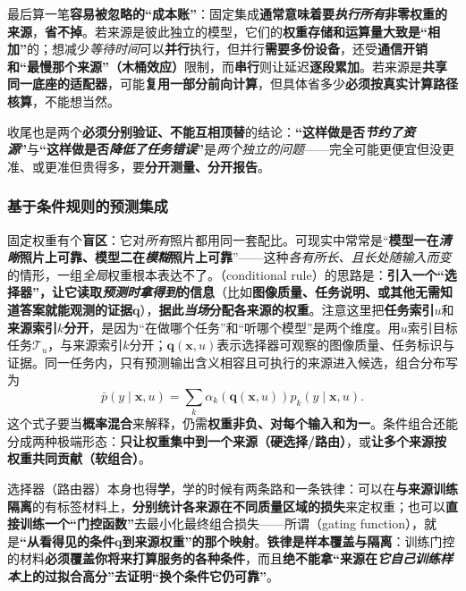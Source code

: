 最后算一笔\textbf{容易被忽略的“成本账”}：固定集成\textbf{通常意味着要\emph{执行所有}非零权重的来源}，\textbf{省不掉}。若来源是彼此独立的模型，它们的\textbf{权重存储和运算量大致是“相加”}的；想减少\emph{等待时间}可以\textbf{并行}执行，但并行\textbf{需要多份设备}，还受\textbf{通信开销和“最慢那个来源”（木桶效应）}限制，而\textbf{串行}则让延迟\textbf{逐段累加}。若来源是\textbf{共享同一底座的适配器}，可能\textbf{复用一部分前向计算}，但具体省多少\textbf{必须按真实计算路径核算}，不能想当然。

收尾也是两个\textbf{必须分别验证、不能互相顶替}的结论：\textbf{“这样做是否\emph{节约了资源}”}与\textbf{“这样做是否\emph{降低了任务错误}”}是\emph{两个独立的问题}——完全可能更便宜但没更准、或更准但贵得多，要\textbf{分开测量、分开报告}。

\subsubsection{基于条件规则的预测集成}
\label{sec:ket-integration-conditional-prediction}

固定权重有个\textbf{盲区}：它对\emph{所有}照片都用同一套配比。可现实中常常是“\textbf{模型一在\emph{清晰}照片上可靠、模型二在\emph{模糊}照片上可靠}”——这种\emph{各有所长、且长处随输入而变}的情形，一组\emph{全局}权重根本表达不了。（conditional rule）的思路是：\textbf{引入一个“选择器”，让它读取\emph{预测时拿得到}的信息}（比如\textbf{图像质量、任务说明、或其他无需知道答案就能观测的证据}$\bm{q}$），\textbf{据此\emph{当场}分配各来源的权重}。注意这里把\textbf{任务索引}$u$和\textbf{来源索引}$k$\textbf{分开}，是因为“在做哪个任务”和“听哪个模型”是两个维度。用$u$索引目标任务$\mathcal T_u$，与来源索引$k$分开；$\bm{q}(\bm{x},u)$表示选择器可观察的图像质量、任务标识与证据。同一任务内，只有预测输出含义相容且可执行的来源进入候选，组合分布写为
\begin{equation}
  \bar p(y\mid\bm{x},u)
  =\sum_k\alpha_k(\bm{q}(\bm{x},u))p_k(y\mid\bm{x},u).
  \label{eq:ket-integration-conditional-average}
\end{equation}
这个式子要当\textbf{概率混合}来解释，仍需\textbf{权重非负、对每个输入和为一}。条件组合还能分成两种极端形态：\textbf{只让权重集中到一个来源（硬选择/路由）}，或\textbf{让多个来源按权重共同贡献（软组合）}。

选择器（路由器）本身也得\textbf{学}，学的时候有两条路和一条铁律：可以在\textbf{与来源训练隔离}的有标签材料上，\textbf{分别统计各来源在不同质量区域的损失}来定权重；也可以\textbf{直接训练一个“门控函数”}去最小化最终组合损失——所谓（gating function），就是\textbf{“从看得见的条件$\bm{q}$到来源权重”的那个映射}。\textbf{铁律是样本覆盖与隔离}：训练门控的材料\textbf{必须覆盖你将来打算服务的各种条件}，而且\textbf{绝不能拿“来源在\emph{它自己训练样本}上的过拟合高分”去证明“换个条件它仍可靠”}。

